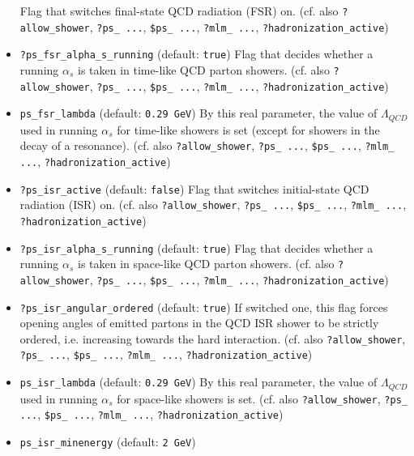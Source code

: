 \documentclass[12pt]{book}
\newcommand{\ttt}[1]{\texttt{#1}}
\begin{document}
\begin{itemize}
Flag that switches final-state QCD radiation (FSR) on.  (cf. also
\ttt{?allow\_shower}, \ttt{?ps\_ ...}, \ttt{\$ps\_ ...}, \ttt{?mlm\_
...}, \ttt{?hadronization\_active})  
\item
\ttt{?ps\_fsr\_alpha\_s\_running} \qquad (default: \ttt{true})
\newline
Flag that decides whether a running $\alpha_s$ is taken in time-like
QCD parton showers. (cf. also \ttt{?allow\_shower}, \ttt{?ps\_ ...},
\ttt{\$ps\_ ...}, \ttt{?mlm\_ ...}, \ttt{?hadronization\_active}) 
\item
\ttt{ps\_fsr\_lambda} \qquad (default: \ttt{0.29 GeV}) \newline
By this real parameter, the value of $\Lambda_{QCD}$ used in running
$\alpha_s$ for time-like showers is set (except for showers in the
decay of a resonance). (cf. also \ttt{?allow\_shower}, \ttt{?ps\_
  ...}, \ttt{\$ps\_ ...}, \ttt{?mlm\_ ...}, \ttt{?hadronization\_active})  
\item
\ttt{?ps\_isr\_active} \qquad (default: \ttt{false}) \newline
Flag that switches initial-state QCD radiation (ISR) on.  (cf. also
\ttt{?allow\_shower}, \ttt{?ps\_ ...}, \ttt{\$ps\_ ...}, \ttt{?mlm\_
...}, \ttt{?hadronization\_active})  
\item
\ttt{?ps\_isr\_alpha\_s\_running} \qquad (default: \ttt{true})
\newline
Flag that decides whether a running $\alpha_s$ is taken in space-like
QCD parton showers. (cf. also \ttt{?allow\_shower}, \ttt{?ps\_ ...},
\ttt{\$ps\_ ...}, \ttt{?mlm\_ ...}, \ttt{?hadronization\_active})  
\item
\ttt{?ps\_isr\_angular\_ordered} \qquad (default: \ttt{true}) \newline 
If switched one, this flag forces opening angles of emitted partons in
the QCD ISR shower to be strictly ordered, i.e. increasing towards the
hard interaction.  (cf. also \ttt{?allow\_shower}, \ttt{?ps\_ ...},
\ttt{\$ps\_ ...}, \ttt{?mlm\_ ...}, \ttt{?hadronization\_active})  
\item
\ttt{ps\_isr\_lambda} \qquad (default: \ttt{0.29 GeV}) \newline
By this real parameter, the value of $\Lambda_{QCD}$ used in running
$\alpha_s$ for space-like showers is set. (cf. also
\ttt{?allow\_shower}, \ttt{?ps\_   ...}, \ttt{\$ps\_ ...}, \ttt{?mlm\_
  ...}, \ttt{?hadronization\_active})   
\item
\ttt{ps\_isr\_minenergy} \qquad (default: \ttt{2 GeV}) \newline

\end{itemize}
\end{document}
